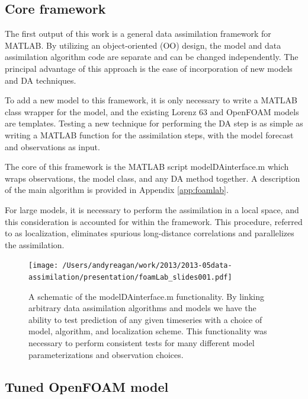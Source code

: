 \documentclass[12pt]{report}
\begin{document}
\subsection{Core framework}

The first output of this work is a general data assimilation framework for MATLAB.
By utilizing an object-oriented (OO) design, the model and data assimilation algorithm code are separate and can be changed independently.
The principal advantage of this approach is the ease of incorporation of new models and DA techniques.

To add a new model to this framework, it is only necessary to write a MATLAB class wrapper for the model, and the existing Lorenz 63 and OpenFOAM models are templates.
Testing a new technique for performing the DA step is as simple as writing a MATLAB function for the assimilation steps, with the model forecast and observations as input.

The core of this framework is the MATLAB script modelDAinterface.m which wraps observations, the model class, and any DA method together.
A description of the main algorithm is provided in Appendix \ref{app:foamlab}.

For large models, it is necessary to perform the assimilation in a local space, and this consideration is accounted for within the framework.
This procedure, referred to as localization, eliminates spurious long-distance correlations and parallelizes the assimilation.

\begin{figure}[t!]
  \centering
  \texttt{[image: /Users/andyreagan/work/2013/2013-05data-assimilation/presentation/foamLab\_slides001.pdf]}
  \caption[A schematic of the modelDAinterface.m functionality]{
    A schematic of the modelDAinterface.m functionality.
    By linking arbitrary data assimilation algorithms and models we have the ability to test prediction of any given timeseries with a choice of model, algorithm, and localization scheme.
    This functionality was necessary to perform consistent tests for many different model parameterizations and observation choices.
  }
  \label{fig:modelDAschem}
\end{figure}

\subsection{Tuned OpenFOAM model}
\end{document}
